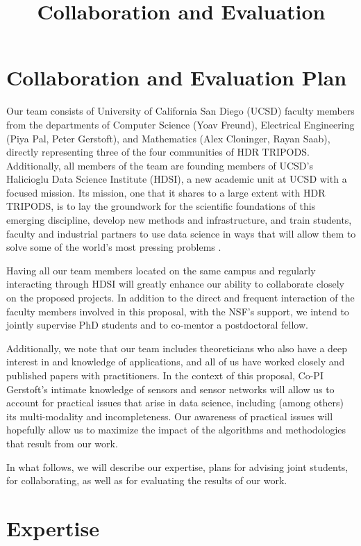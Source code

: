 \documentclass{article}
\title{Collaboration and Evaluation}
\begin{document}
\section*{Collaboration and Evaluation Plan}

Our team consists of University of California San Diego (UCSD) faculty members from the departments of Computer Science (Yoav Freund), Electrical Engineering (Piya Pal, Peter Gerstoft), and Mathematics (Alex Cloninger, Rayan Saab), directly representing three of the four communities of HDR TRIPODS.  Additionally, all members of the team are founding members of UCSD's Halicioglu Data Science Institute (HDSI), a new academic unit at UCSD with a focused mission. Its mission, one that it shares to a large extent with HDR TRIPODS, is to lay the groundwork for the scientific foundations of this emerging discipline, develop new methods and infrastructure, and train students, faculty and industrial partners to use data science in ways that will allow them to solve some of the world’s most pressing problems \cite{the HDSI website}. 

Having all our team members located on the same campus and regularly interacting through HDSI will greatly enhance our ability to collaborate closely on the proposed projects. In addition to the direct and frequent interaction of the faculty members involved in this proposal, with the NSF's support, we intend to jointly supervise PhD students and to co-mentor a postdoctoral fellow. 

Additionally, we note that our team includes theoreticians who also have a deep interest in and knowledge of applications, and all  of us have worked closely and published papers with practitioners. In the context of this proposal, Co-PI Gerstoft's intimate knowledge of sensors and sensor networks will allow us to account for practical issues that arise in data science, including (among others) its multi-modality and incompleteness. Our awareness of practical issues will hopefully allow us to maximize the impact of the algorithms and methodologies that result from our work.  



In what follows, we will describe our expertise, plans for advising joint students, for collaborating, as well as for evaluating the results of our work.  
 
\section{Expertise}
\end{document}
